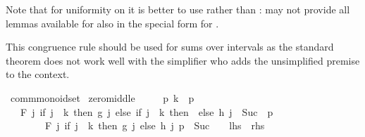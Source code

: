 \begin{isabellebody}
\begin{isamarkuptext}
Note that for uniformity on  it is better to use
 rather than :  may
not provide all lemmas available for  also in the
special form for .%
\end{isamarkuptext}\isamarkuptrue%
%
\begin{isamarkuptext}%
This congruence rule should be used for sums over intervals as
the standard theorem  does not work well
with the simplifier who adds the unsimplified premise  to
the context.%
\end{isamarkuptext}\isamarkuptrue%
\isamarkupfalse%
\ comm{\isacharunderscore}{\kern0pt}monoid{\isacharunderscore}{\kern0pt}set\isanewline
{}\isanewline
\isanewline
{}\isamarkupfalse%
\ zero{\isacharunderscore}{\kern0pt}middle{\isacharcolon}{\kern0pt}\isanewline
\ \ \ {\isachardoublequoteopen}{}\ {\isasymle}\ p{\isachardoublequoteclose}\ {\isachardoublequoteopen}k\ {\isasymle}\ p{\isachardoublequoteclose}\isanewline
\ \ \ {\isachardoublequoteopen}F\ {\isacharparenleft}{\kern0pt}{\isasymlambda}j{\isachardot}{\kern0pt}\ if\ j\ {\isacharless}{\kern0pt}\ k\ then\ g\ j\ else\ if\ j\ {\isacharequal}{\kern0pt}\ k\ then\ \ else\ h\ {\isacharparenleft}{\kern0pt}j\ {\isacharminus}{\kern0pt}\ Suc\ {}{\isacharparenright}{\kern0pt}{\isacharparenright}{\kern0pt}\ {\isacharbraceleft}{\kern0pt}{\isachardot}{\kern0pt}{\isachardot}{\kern0pt}p{\isacharbraceright}{\kern0pt}\isanewline
\ \ \ \ \ \ \ {\isacharequal}{\kern0pt}\ F\ {\isacharparenleft}{\kern0pt}{\isasymlambda}j{\isachardot}{\kern0pt}\ if\ j\ {\isacharless}{\kern0pt}\ k\ then\ g\ j\ else\ h\ j{\isacharparenright}{\kern0pt}\ {\isacharbraceleft}{\kern0pt}{\isachardot}{\kern0pt}{\isachardot}{\kern0pt}p\ {\isacharminus}{\kern0pt}\ Suc\ {}{\isacharbraceright}{\kern0pt}{\isachardoublequoteclose}\ \ {\isacharparenleft}{\kern0pt}\ {\isachardoublequoteopen}{\isacharquery}{\kern0pt}lhs\ {\isacharequal}{\kern0pt}\ {\isacharquery}{\kern0pt}rhs{\isachardoublequoteclose}{\isacharparenright}{\kern0pt}\isanewline

\end{isabellebody}
